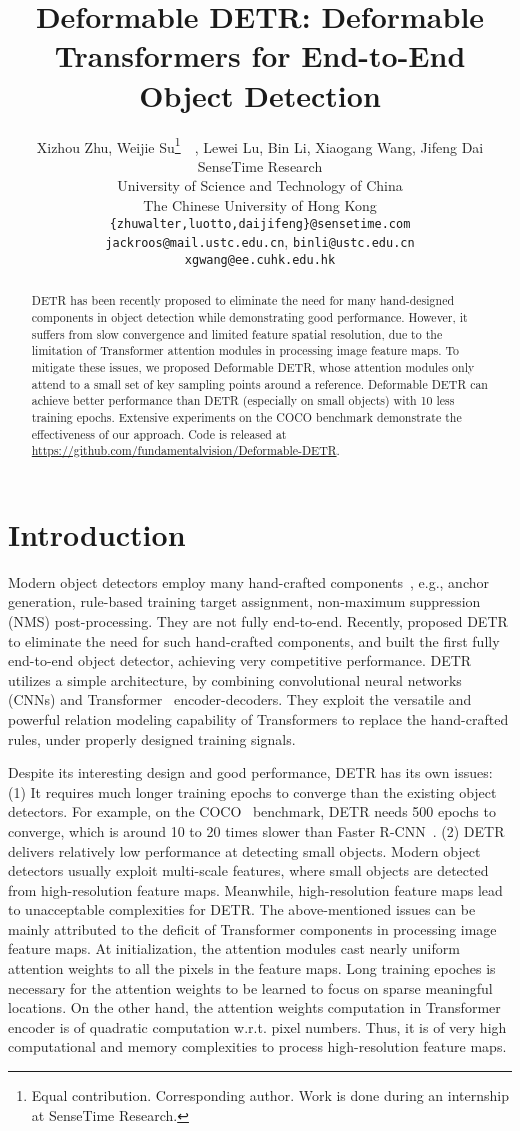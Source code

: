 \documentclass{article}
\title{Deformable DETR: Deformable Transformers for End-to-End Object Detection}
\author{Xizhou Zhu, Weijie Su\thanks{Equal contribution. Corresponding author. Work is done during an internship at SenseTime Research.}~~, Lewei Lu, Bin Li, Xiaogang Wang, Jifeng Dai  \\
SenseTime Research \\
University of Science and Technology of China \\
The Chinese University of Hong Kong
\\
\texttt{\{zhuwalter,luotto,daijifeng\}@sensetime.com} \\
\texttt{jackroos@mail.ustc.edu.cn}, \texttt{binli@ustc.edu.cn}
\\
\texttt{xgwang@ee.cuhk.edu.hk}
}
\begin{document}
\maketitle

\begin{abstract}
DETR has been recently proposed to eliminate the need for many hand-designed components in object detection while demonstrating good performance. However, it suffers from slow convergence and limited feature spatial resolution, due to the limitation of Transformer attention modules in processing image feature maps. To mitigate these issues, we proposed Deformable DETR, whose attention modules only attend to a small set of key sampling points around a reference. Deformable DETR can achieve better performance than DETR (especially on small objects) with 10 less training epochs. Extensive experiments on the COCO benchmark demonstrate the effectiveness of our approach. Code is released at \url{https://github.com/fundamentalvision/Deformable-DETR}.
\end{abstract} \section{Introduction}


Modern object detectors employ many hand-crafted components~\citep{liu2020deep}, e.g., anchor generation, rule-based training target assignment, non-maximum suppression (NMS) post-processing. They are not fully end-to-end. Recently, \citet{carion2020end} proposed DETR to eliminate the need for such hand-crafted components, and built the first fully end-to-end object detector, achieving very competitive performance. DETR utilizes a simple architecture, by combining convolutional neural networks (CNNs) and Transformer~\citep{vaswani2017attention} encoder-decoders. They exploit the versatile and powerful relation modeling capability of Transformers to replace the hand-crafted rules, under properly designed training signals. 


Despite its interesting design and good performance, DETR has its own issues: (1) It requires much longer training epochs to converge than the existing object detectors. For example, on the COCO~\citep{lin2014microsoft} benchmark, DETR needs 500 epochs to converge, which is around 10 to 20 times slower than Faster R-CNN~\citep{ren2015faster}. (2) DETR delivers relatively low performance at detecting small objects. Modern object detectors usually exploit multi-scale features, where small objects are detected from high-resolution feature maps. Meanwhile, high-resolution feature maps lead to unacceptable complexities for DETR. The above-mentioned issues can be mainly attributed to the deficit of Transformer components in processing image feature maps. At initialization, the attention modules cast nearly uniform attention weights to all the pixels in the feature maps. Long training epoches is necessary for the attention weights to be learned to focus on sparse meaningful locations.
On the other hand, the attention weights computation in Transformer encoder is of quadratic computation w.r.t. pixel numbers. Thus, it is of very high computational and memory complexities to process high-resolution feature maps.
\end{document}
